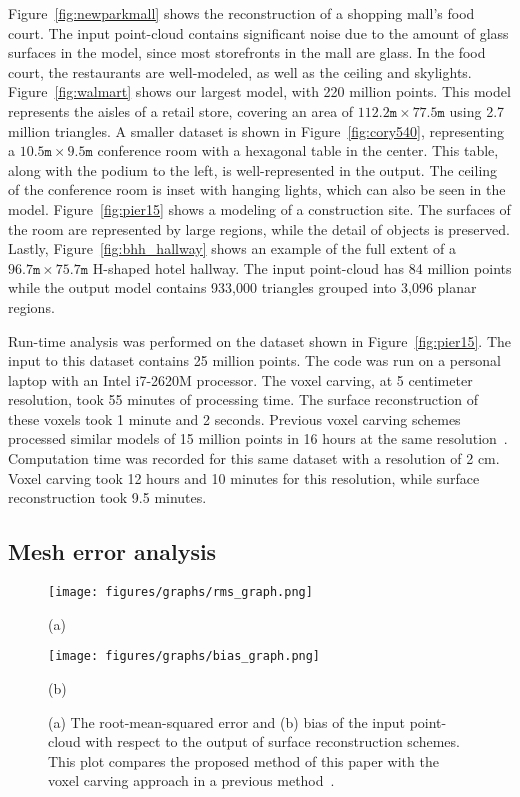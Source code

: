 \documentclass[10pt,twocolumn,letterpaper]{article}
\begin{document}
Figure~\ref{fig:newparkmall} shows the reconstruction of a shopping mall's food court.  The input point-cloud contains significant noise due to the amount of glass surfaces in the model, since most storefronts in the mall are glass.  In the food court, the restaurants are well-modeled, as well as the ceiling and skylights.  Figure~\ref{fig:walmart} shows our largest model, with 220 million points.  This model represents the aisles of a retail store, covering an area of $112.2\texttt{m} \times 77.5\texttt{m}$ using 2.7 million triangles.  A smaller dataset is shown in Figure~\ref{fig:cory540}, representing a $10.5\texttt{m} \times 9.5\texttt{m}$ conference room with a hexagonal table in the center.  This table, along with the podium to the left, is well-represented in the output.  The ceiling of the conference room is inset with hanging lights, which can also be seen in the model.  Figure~\ref{fig:pier15} shows a modeling of a construction site.  The surfaces of the room are represented by large regions, while the detail of objects is preserved.  Lastly, Figure~\ref{fig:bhh_hallway} shows an example of the full extent of a $96.7\texttt{m} \times 75.7\texttt{m}$ H-shaped hotel hallway.  The input point-cloud has 84 million points while the output model contains 933,000 triangles grouped into 3,096 planar regions.

Run-time analysis was performed on the dataset shown in Figure~\ref{fig:pier15}.  The input to this dataset contains 25 million points.  The code was run on a personal laptop with an Intel i7-2620M processor.  The voxel carving, at 5 centimeter resolution, took 55 minutes of processing time.  The surface reconstruction of these voxels took 1 minute and 2 seconds.  Previous voxel carving schemes processed similar models of 15 million points in 16 hours at the same resolution~\cite{Carving}.  Computation time was recorded for this same dataset with a resolution of 2 cm.  Voxel carving took 12 hours and 10 minutes for this resolution, while surface reconstruction took 9.5 minutes.

\subsection{Mesh error analysis}
\label{sec:analysis}

\begin{figure}[t]
	\centerline{\texttt{[image: figures/graphs/rms\_graph.png]}}
	\centerline{(a)}
	\centerline{\texttt{[image: figures/graphs/bias\_graph.png]}}
	\centerline{(b)}
	\caption{(a) The root-mean-squared error and (b) bias of the input point-cloud with respect to the output of surface reconstruction schemes.  This plot compares the proposed method of this paper with the voxel carving approach in a previous method~\protect\cite{Carving}.}
	\label{fig:accuracy_plots}
\end{figure}
\end{document}

